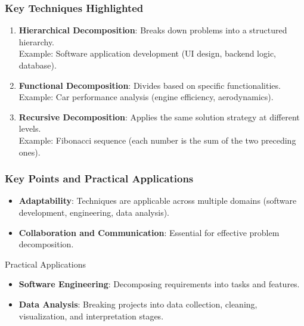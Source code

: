 \documentclass[aspectratio=169]{beamer}
\begin{document}
\begin{frame}[fragile]
    \frametitle{Key Techniques Highlighted}
    \begin{enumerate}
        \item \textbf{Hierarchical Decomposition}: Breaks down problems into a structured hierarchy. \\
        Example: Software application development (UI design, backend logic, database).
        
        \item \textbf{Functional Decomposition}: Divides based on specific functionalities. \\
        Example: Car performance analysis (engine efficiency, aerodynamics).
        
        \item \textbf{Recursive Decomposition}: Applies the same solution strategy at different levels. \\
        Example: Fibonacci sequence (each number is the sum of the two preceding ones).
    \end{enumerate}
\end{frame}

\begin{frame}[fragile]
    \frametitle{Key Points and Practical Applications}
    \begin{itemize}
        \item \textbf{Adaptability}: Techniques are applicable across multiple domains (software development, engineering, data analysis).
        \item \textbf{Collaboration and Communication}: Essential for effective problem decomposition.
    \end{itemize}
    \begin{block}{Practical Applications}
        \begin{itemize}
            \item \textbf{Software Engineering}: Decomposing requirements into tasks and features.
            \item \textbf{Data Analysis}: Breaking projects into data collection, cleaning, visualization, and interpretation stages.
        \end{itemize}
    \end{block}
\end{frame}
\end{document}
